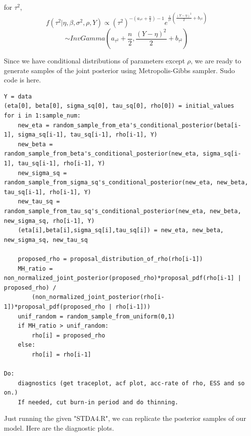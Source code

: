 \documentclass{article}
\begin{document}
for $\tau^2$,
\[f(\tau^2|\eta,\beta,\sigma^2,\rho,Y) \propto (\tau^2)^{-(a_{\tau^2}+\frac{n}{2})-1} e^{\frac{1}{\tau^2}(\frac{(Y - \eta)^2}{2}+b_{\tau^2})}
\]
\[\sim InvGamma(a_{\tau^2}+\frac{n}{2}, \frac{(Y - \eta)^2}{2}+b_{\tau^2})\]


Since we have conditional distributions of parameters except $\rho$,
we are ready to generate samples of the joint posterior using Metropolis-Gibbs sampler.
Sudo code is here.
\begin{mdframed}
    \begin{small}
        \begin{verbatim}
Y = data
(eta[0], beta[0], sigma_sq[0], tau_sq[0], rho[0]) = initial_values
for i in 1:sample_num:
    new_eta = random_sample_from_eta's_conditional_posterior(beta[i-1], sigma_sq[i-1], tau_sq[i-1], rho[i-1], Y)
    new_beta = random_sample_from_beta's_conditional_posterior(new_eta, sigma_sq[i-1], tau_sq[i-1], rho[i-1], Y)
    new_sigma_sq = random_sample_from_sigma_sq's_conditional_posterior(new_eta, new_beta, tau_sq[i-1], rho[i-1], Y)
    new_tau_sq = random_sample_from_tau_sq's_conditional_posterior(new_eta, new_beta, new_sigma_sq, rho[i-1], Y)
    (eta[i],beta[i],sigma_sq[i],tau_sq[i]) = new_eta, new_beta, new_sigma_sq, new_tau_sq

    proposed_rho = proposal_distribution_of_rho(rho[i-1])
    MH_ratio = non_normalized_joint_posterior(proposed_rho)*proposal_pdf(rho[i-1] | proposed_rho) / 
        (non_normalized_joint_posterior(rho[i-1])*proposal_pdf(proposed_rho | rho[i-1]))
    unif_random = random_sample_from_uniform(0,1)
    if MH_ratio > unif_random:
        rho[i] = proposed_rho
    else:
        rho[i] = rho[i-1]

Do:
    diagnostics (get traceplot, acf plot, acc-rate of rho, ESS and so on.)
    If needed, cut burn-in period and do thinning.
        \end{verbatim}
    \end{small}
\end{mdframed}

Just running the given "STDA4.R", we can replicate the posterior samples of our model.
Here are the diagnostic plots.
\end{document}
